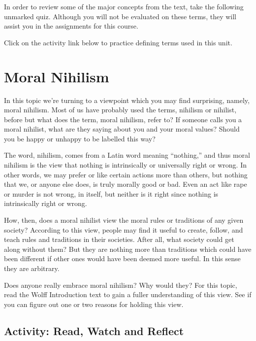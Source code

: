 \documentclass[
]{book}
\begin{document}
\begin{reflect}
In order to review some of the major concepts from the text, take the following unmarked quiz. Although you will not be evaluated on these terms, they will assist you in the assignments for this course.

Click on the activity link below to practice defining terms used in this unit.
\end{reflect}

\hypertarget{moral-nihilism}{%
\section{Moral Nihilism}\label{moral-nihilism}}

In this topic we're turning to a viewpoint which you may find surprising, namely, moral nihilism. Most of us have probably used the terms, nihilism or nihilist, before but what does the term, moral nihilism, refer to? If someone calls you a moral nihilist, what are they saying about you and your moral values? Should you be happy or unhappy to be labelled this way?

The word, nihilism, comes from a Latin word meaning ``nothing,'' and thus moral nihilism is the view that nothing is intrinsically or universally right or wrong. In other words, we may prefer or like certain actions more than others, but nothing that we, or anyone else does, is truly morally good or bad. Even an act like rape or murder is not wrong, in itself, but neither is it right since nothing is intrinsically right or wrong.

How, then, does a moral nihilist view the moral rules or traditions of any given society? According to this view, people may find it useful to create, follow, and teach rules and traditions in their societies. After all, what society could get along without them? But they are nothing more than traditions which could have been different if other ones would have been deemed more useful. In this sense they are arbitrary.

Does anyone really embrace moral nihilism? Why would they? For this topic, read the Wolff Introduction text to gain a fuller understanding of this view. See if you can figure out one or two reasons for holding this view.

\hypertarget{activity-read-watch-and-reflect-1}{%
\subsection*{Activity: Read, Watch and Reflect}\label{activity-read-watch-and-reflect-1}}
\end{document}
